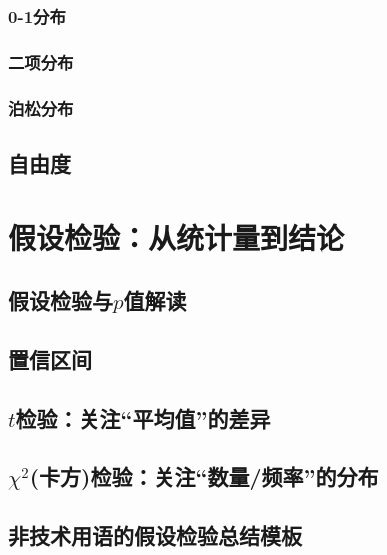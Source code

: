 \documentclass[lang=cn,10pt]{elegantbook}
\begin{document}
\subsection{0-1分布}


\subsection{二项分布}


\subsection{泊松分布}



\section{自由度}






\chapter{假设检验：从统计量到结论}
\section{假设检验与$p$值解读}



\section{置信区间}



\section{$t$检验：关注“平均值”的差异}



\section{$\chi^2$(卡方)检验：关注“数量/频率”的分布}



\section{非技术用语的假设检验总结模板}
\end{document}
